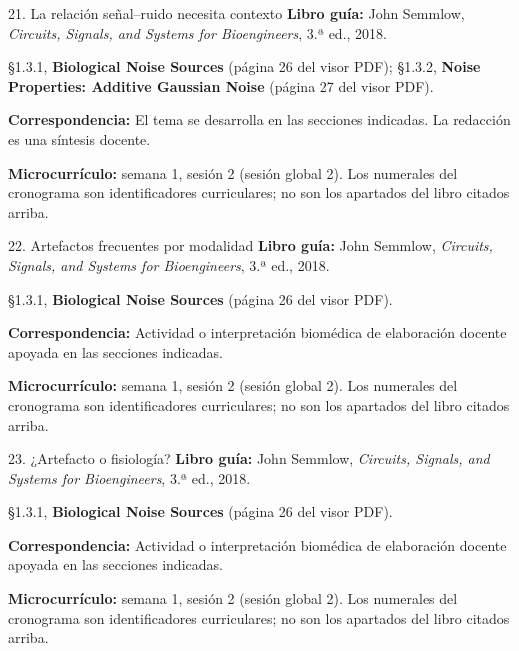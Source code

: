 \documentclass[
  10pt,
  ignorenonframetext,
  aspectratio=169,
  spanish,
]{beamer}
\begin{document}
\begin{frame}{21. La relación señal--ruido necesita contexto}
\label{la-relaciuxf3n-seuxf1alruido-necesita-contexto}
\textbf{Libro guía:} John Semmlow, \emph{Circuits, Signals, and Systems
for Bioengineers}, 3.ª ed., 2018.

§1.3.1, \textbf{Biological Noise Sources} (página 26 del visor PDF);
§1.3.2, \textbf{Noise Properties: Additive Gaussian Noise} (página 27
del visor PDF).

\textbf{Correspondencia:} El tema se desarrolla en las secciones
indicadas. La redacción es una síntesis docente.

\textbf{Microcurrículo:} semana 1, sesión 2 (sesión global 2). Los
numerales del cronograma son identificadores curriculares; no son los
apartados del libro citados arriba.
\end{frame}

\begin{frame}{22. Artefactos frecuentes por modalidad}
\label{artefactos-frecuentes-por-modalidad}
\textbf{Libro guía:} John Semmlow, \emph{Circuits, Signals, and Systems
for Bioengineers}, 3.ª ed., 2018.

§1.3.1, \textbf{Biological Noise Sources} (página 26 del visor PDF).

\textbf{Correspondencia:} Actividad o interpretación biomédica de
elaboración docente apoyada en las secciones indicadas.

\textbf{Microcurrículo:} semana 1, sesión 2 (sesión global 2). Los
numerales del cronograma son identificadores curriculares; no son los
apartados del libro citados arriba.
\end{frame}

\begin{frame}{23. ¿Artefacto o fisiología?}
\label{artefacto-o-fisiologuxeda}
\textbf{Libro guía:} John Semmlow, \emph{Circuits, Signals, and Systems
for Bioengineers}, 3.ª ed., 2018.

§1.3.1, \textbf{Biological Noise Sources} (página 26 del visor PDF).

\textbf{Correspondencia:} Actividad o interpretación biomédica de
elaboración docente apoyada en las secciones indicadas.

\textbf{Microcurrículo:} semana 1, sesión 2 (sesión global 2). Los
numerales del cronograma son identificadores curriculares; no son los
apartados del libro citados arriba.
\end{frame}
\end{document}

